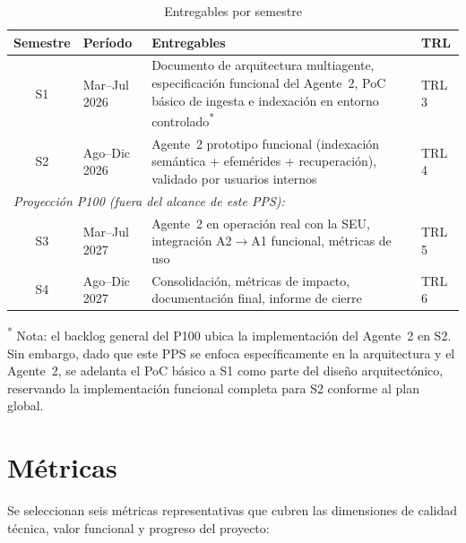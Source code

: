 \documentclass[a4paper, 12pt]{article}
\begin{document}
\begin{table}[htbp]
  \centering
  \caption{Entregables por semestre}
  \label{tab:entregables}
  \begin{tabularx}{\textwidth}{clXl}
    \toprule
    \textbf{Semestre} & \textbf{Per\'iodo} & \textbf{Entregables} & \textbf{TRL} \\
    \midrule
    S1 & Mar--Jul 2026 & Documento de arquitectura multiagente, especificaci\'on funcional del Agente~2, PoC b\'asico de ingesta e indexaci\'on en entorno controlado\textsuperscript{*} & TRL 3 \\
    S2 & Ago--Dic 2026 & Agente~2 prototipo funcional (indexaci\'on sem\'antica + efem\'erides + recuperaci\'on), validado por usuarios internos & TRL 4 \\
    \midrule
    \multicolumn{4}{l}{\textit{Proyecci\'on P100 (fuera del alcance de este PPS):}} \\
    \midrule
    S3 & Mar--Jul 2027 & Agente~2 en operaci\'on real con la SEU, integraci\'on A2$\rightarrow$A1 funcional, m\'etricas de uso & TRL 5 \\
    S4 & Ago--Dic 2027 & Consolidaci\'on, m\'etricas de impacto, documentaci\'on final, informe de cierre & TRL 6 \\
    \bottomrule
  \end{tabularx}

  \vspace{0.3cm}
  \footnotesize{\textsuperscript{*} Nota: el backlog general del \ac{P100} ubica la implementaci\'on del Agente~2 en S2. Sin embargo, dado que este PPS se enfoca espec\'ificamente en la arquitectura y el Agente~2, se adelanta el PoC b\'asico a S1 como parte del dise\~no arquitect\'onico, reservando la implementaci\'on funcional completa para S2 conforme al plan global.}
\end{table}

\section{M\'etricas}

Se seleccionan seis m\'etricas representativas que cubren las dimensiones de calidad t\'ecnica, valor funcional y progreso del proyecto:
\end{document}
